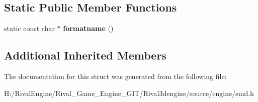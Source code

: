 \subsection*{Static Public Member Functions}
\begin{DoxyCompactItemize}
\item 
\mbox{\label{structsmd_af04c232d05336a8e1172ca9d3ccfd76c}} 
static const char $\ast$ {\bfseries formatname} ()
\end{DoxyCompactItemize}
\subsection*{Additional Inherited Members}


The documentation for this struct was generated from the following file\+:\begin{DoxyCompactItemize}
\item 
H\+:/\+Rival\+Engine/\+Rival\+\_\+\+Game\+\_\+\+Engine\+\_\+\+G\+I\+T/\+Rival3dengine/source/engine/smd.\+h\end{DoxyCompactItemize}
